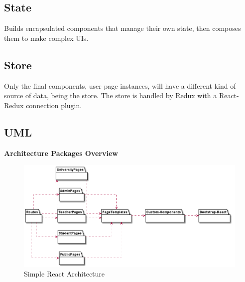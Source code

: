 \documentclass[../react]{subfiles}
\begin{document}
	\subsection{State}
	Builds encapsulated components that manage their own state, then composes them to make complex UIs.

	\subsection{Store}
	Only the final components, user page instances, will have a different kind of source of data, being the store.
	The store is handled by Redux with a React-Redux connection plugin.
	
	\subsection{UML} %
	
	\textbf{Architecture Packages Overview}
	\begin{figure}[H]
		\centering
		\includegraphics[width=1\linewidth]{"diagrammi/react/simplearch"}
		\caption{Simple React Architecture}
		\label{fig:Simple React Architecture}
	\end{figure}
\end{document}
